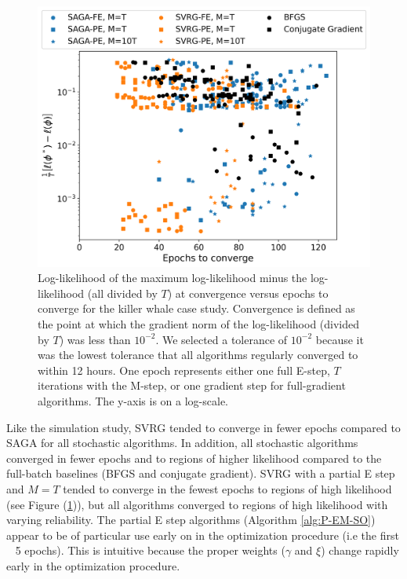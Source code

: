 \begin{figure}
    \centering
    \includegraphics[width=6.5in]{../plt/scatterplot_case_study.png}
    \caption{Log-likelihood of the maximum log-likelihood minus the log-likelihood (all divided by $T$) at convergence versus epochs to converge for the killer whale case study. Convergence is defined as the point at which the gradient norm of the log-likelihood (divided by $T$) was less than $10^{-2}$. We selected a tolerance of $10^{-2}$ because it was the lowest tolerance that all algorithms regularly converged to within 12 hours. One epoch represents either one full E-step, $T$ iterations with the M-step, or one gradient step for full-gradient algorithms. The y-axis is on a log-scale.}
    \label{fig:scatterplot_case}
\end{figure}

Like the simulation study, SVRG tended to converge in fewer epochs compared to SAGA for all stochastic algorithms. In addition, all stochastic algorithms converged in fewer epochs and to regions of higher likelihood compared to the full-batch baselines (BFGS and conjugate gradient). SVRG with a partial E step and $M=T$ tended to converge in the fewest epochs to regions of high likelihood (see Figure (\ref{fig:scatterplot_case})), but all algorithms converged to regions of high likelihood with varying reliability. The partial E step algorithms (Algorithm \ref{alg:P-EM-SO}) appear to be of particular use early on in the optimization procedure (i.e the first ~ 5 epochs). This is intuitive because the proper weights ($\gamma$ and $\xi$) change rapidly early in the optimization procedure.

